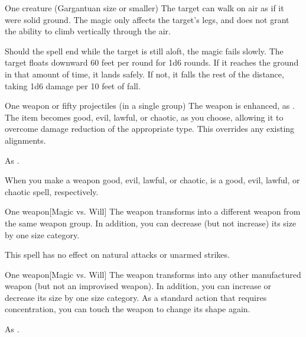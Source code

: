 \spellrng{\rngtouch}
\spelldur{\durshort}
\begin{spelltarget}{One creature (Gargantuan size or smaller)}
    \spelleffect The target can walk on air as if it were solid ground. The magic only affects the target's legs, and does not grant the ability to climb vertically through the air.
    \par Should the spell end while the target is still aloft, the magic fails slowly. The target floats downward 60 feet per round for 1d6 rounds. If it reaches the ground in that amount of time, it lands safely. If not, it falls the rest of the distance, taking 1d6 damage per 10 feet of fall.
\end{spelltarget}

\spellrng{\rngclose}
\begin{spelltarget}{One weapon or fifty projectiles (in a single group)}
    \spelleffect The weapon is enhanced, as .
    \spellsuccess The item becomes good, evil, lawful, or chaotic, as you choose, allowing it to overcome damage reduction of the appropriate type. This overrides any existing alignments.
\end{spelltarget}
\spellnotes As .

When you make a weapon good, evil, lawful, or chaotic,  is a good, evil, lawful, or chaotic spell, respectively.

\spelldur{\durmed}
\begin{spelltarget}{One weapon}[Magic vs. Will]
    \spellsuccess The weapon transforms into a different weapon from the same weapon group. In addition, you can decrease (but not increase) its size by one size category.
\end{spelltarget}
\spellnotes This spell has no effect on natural attacks or unarmed strikes.

\spelldur{\durmed}
\begin{spelltarget}{One weapon}[Magic vs. Will]
    \spellsuccess The weapon transforms into any other manufactured weapon (but not an improvised weapon). In addition, you can increase or decrease its size by one size category.
    \spelleffect As a standard action that requires concentration, you can touch the weapon to change its shape again.
\end{spelltarget}
\spellnotes As .

